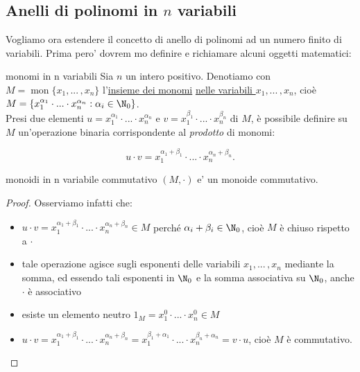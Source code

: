 
\subsection{Anelli di polinomi in $n$ variabili}

\noindent Vogliamo ora estendere il concetto di anello di polinomi ad un numero finito di variabili.
Prima pero' dovrem
mo definire e richiamare alcuni oggetti matematici:

\begin{defn}{monomi in n variabili}
  Sia $n$ un intero positivo. Denotiamo con $M=\operatorname{mon}\{x_1,...\,,x_n\}$ l'\underline{insieme dei monomi} 
  \underline{nelle variabili $x_1,...\,,x_n$}, cioè $M=\{x_1^{\alpha_1}\cdot ...\cdot x_n^{\alpha_n}: \alpha_i\in\N_0\}$. \vspace{2mm}\\
  \noindent Presi due elementi $u=x_1^{\alpha_1}\cdot ...\cdot x_n^{\alpha_n}$ e $v=x_1^{\beta_1}\cdot ...\cdot x_n^{\beta_n}$ di $M$, 
  è possibile definire su $M$ un'operazione binaria corrispondente al \emph{prodotto} di monomi: 

  \[ u\cdot v=x_1^{\alpha_1+\beta_1}\cdot ...\cdot x_n^{\alpha_n+\beta_n}.\] 
\end{defn} 
\vspace{-2mm}

\begin{prop}[]{monoidi in n variabile commutativo}
  $(M, \cdot)$ e' un monoide commutativo.
\end{prop}
\begin{proof}
  Osserviamo infatti che: 
  \begin{itemize}
  \item $u\cdot v=x_1^{\alpha_1+\beta_1}\cdot ...\cdot x_n^{\alpha_n+\beta_n}\in M$ perché $\alpha_i+\beta_i\in \N_0$, 
  cioè $M$ è chiuso rispetto a $\cdot$
  \item tale operazione agisce sugli esponenti delle variabili $x_1, ...\,,x_n$ mediante la somma, ed essendo tali esponenti in $\N_0$ 
  e la somma associativa su $\N_0$, anche $\cdot$ è associativo
  \item esiste un elemento neutro $1_{M}=x_1^0\cdot ... \cdot x_n^0\in M$
  \item $u\cdot v=x_1^{\alpha_1+\beta_1}\cdot ...\cdot x_n^{\alpha_n+\beta_n}=x_1^{\beta_1+\alpha_1}\cdot ...\cdot x_n^{\beta_n+\alpha_n}=v\cdot u$, 
  cioè $M$ è commutativo.
  \end{itemize}
\end{proof}

